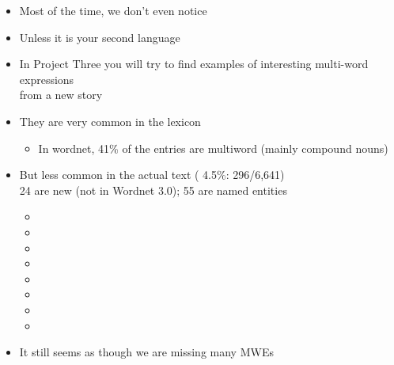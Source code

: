 \documentclass[a4paper,landscape,headrule,footrule,xetex]{foils}
\begin{document}
\begin{itemize}
\item Most of the time, we don't even notice
\item Unless it is your second language
\item In Project Three you will try to find examples of interesting
  multi-word expressions
\\ from a new story
\end{itemize}


\begin{itemize}
\item They are very common in the lexicon
  \begin{itemize}
  \item In wordnet,  41\% of the entries are multiword (mainly compound nouns)
  \end{itemize}
\item But less common in the actual text ( 4.5\%: 296/6,641)
\\ 24 are new (not in Wordnet 3.0); 55 are named entities




  \begin{itemize}
  \item {}
  \item {}
  \item {}
  \item {}
  \item {}
  \item {}
  \item {}
  \item {} 
  \end{itemize}
\item It still seems as though we are missing many MWEs
\end{itemize}
\end{document}

